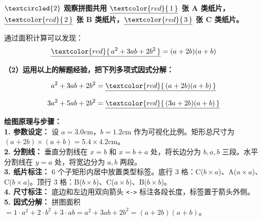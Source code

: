 \vspace{0.3cm}
\textbf{$\textcircled{2}$ 观察拼图共用 $\underline{\textcolor{red}{\,1\,}}$ 张 A 类纸片，$\underline{\textcolor{red}{\,2\,}}$ 张 B 类纸片，$\underline{\textcolor{red}{\,3\,}}$ 张 C 类纸片。}

通过面积计算可以发现：
$$\underline{\textcolor{red}{\,a^2 + 3ab + 2b^2\,}} = (a+2b)(a+b)$$

\vspace{0.3cm}
\textbf{（2）运用以上的解题经验，把下列多项式因式分解：}

$$a^2 + 3ab + 2b^2 = \underline{\textcolor{red}{\,(a+2b)(a+b)\,}}$$

$$3a^2 + 5ab + 2b^2 = \underline{\textcolor{red}{\,(3a+2b)(a+b)\,}}$$

\vspace{0.4cm}
{\small\color{blue!70!black}
\textbf{绘图原理与步骤：}\\
\textbf{1. 参数设定：} 设 $a = 3.0$cm，$b = 1.2$cm 作为可视化比例。矩形总尺寸为 $(a+2b) \times (a+b) = 5.4 \times 4.2$cm。\\
\textbf{2. 分割线：} 垂直分割线在 $x = b$ 和 $x = b + a$ 处，将长边分为 $b, a, b$ 三段。水平分割线在 $y = a$ 处，将宽边分为 $a, b$ 两段。\\
\textbf{3. 纸片标注：} 6 个子矩形内居中放置类型标签。底行 3 格：C($b \times a$)、A($a \times a$)、C($b \times a$)。顶行 3 格：B($b \times b$)、C($a \times b$)、B($b \times b$)。\\
\textbf{4. 尺寸标注：} 底边和左边用双向箭头 \texttt{<->} 标注各段长度，标签置于箭头外侧。\\
\textbf{5. 因式分解：} 拼图面积 $= 1 \cdot a^2 + 2 \cdot b^2 + 3 \cdot ab = a^2 + 3ab + 2b^2 = (a+2b)(a+b)$。
}

\newpage


